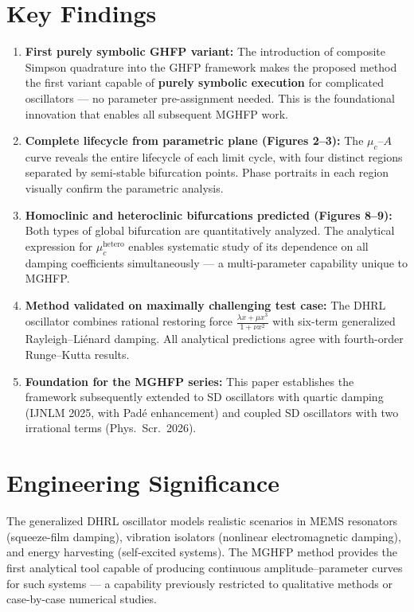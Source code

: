 \documentclass[11pt,a4paper]{article}
\begin{document}
\section{Key Findings}

\begin{enumerate}[leftmargin=2em]
\item \textbf{First purely symbolic GHFP variant:} The introduction of composite Simpson quadrature into the GHFP framework makes the proposed method the first variant capable of \textbf{purely symbolic execution} for complicated oscillators --- no parameter pre-assignment needed. This is the foundational innovation that enables all subsequent MGHFP work.

\item \textbf{Complete lifecycle from parametric plane (Figures 2--3):} The $\mu_c$--$A$ curve reveals the entire lifecycle of each limit cycle, with four distinct regions separated by semi-stable bifurcation points. Phase portraits in each region visually confirm the parametric analysis.

\item \textbf{Homoclinic and heteroclinic bifurcations predicted (Figures 8--9):} Both types of global bifurcation are quantitatively analyzed. The analytical expression for $\mu_c^{\mathrm{hetero}}$ enables systematic study of its dependence on all damping coefficients simultaneously --- a multi-parameter capability unique to MGHFP.

\item \textbf{Method validated on maximally challenging test case:} The DHRL oscillator combines rational restoring force $\frac{\lambda x + \mu x^3}{1+\nu x^2}$ with six-term generalized Rayleigh--Li\'enard damping. All analytical predictions agree with fourth-order Runge--Kutta results.

\item \textbf{Foundation for the MGHFP series:} This paper establishes the framework subsequently extended to SD oscillators with quartic damping (IJNLM 2025, with Pad\'e enhancement) and coupled SD oscillators with two irrational terms (Phys.\ Scr.\ 2026).
\end{enumerate}

\section{Engineering Significance}

The generalized DHRL oscillator models realistic scenarios in MEMS resonators (squeeze-film damping), vibration isolators (nonlinear electromagnetic damping), and energy harvesting (self-excited systems). The MGHFP method provides the first analytical tool capable of producing continuous amplitude--parameter curves for such systems --- a capability previously restricted to qualitative methods or case-by-case numerical studies.
\end{document}

